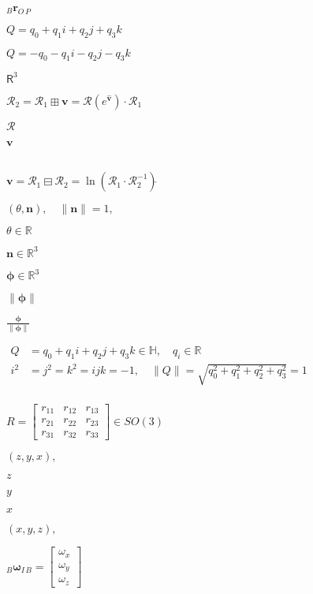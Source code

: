 \documentclass{article}
\begin{document}
${}_B \mathbf{r}_{O\,P}$
\pagebreak

$Q = q_0 + q_1 i + q_2 j + q_3 k$
\pagebreak

$Q = -q_0 - q_1 i - q_2 j - q_3 k$
\pagebreak

$\mathsf{R}^3$
\pagebreak

$\mathcal{R}_2 = \mathcal{R}_1\boxplus\mathbf{v} = \mathcal{R}(e^{\hat{\mathbf{v}}}) \cdot \mathcal{R}_1 $
\pagebreak

$\mathcal{R}$
\pagebreak

$\mathbf{v}$
\pagebreak

$\hat{}$
\pagebreak

$\mathbf{v} = \mathcal{R}_1\boxminus\mathcal{R}_2 = \ln{(\mathcal{R}_1\cdot\mathcal{R}_2^{-1})}\check{}$
\pagebreak

$\boxed{(\theta, \mathbf{n}), \quad \lVert \mathbf{n} \rVert = 1,}$
\pagebreak

$\theta \in \mathbb{R}$
\pagebreak

$\mathbf{n} \in \mathbb{R}^3$
\pagebreak

$\boxed{\mathbf{\phi}\in\mathbb{R}^3}$
\pagebreak

$\lVert \mathbf{\phi} \rVert $
\pagebreak

$\frac{\mathbf{\phi}}{\lVert \mathbf{\phi} \rVert}$
\pagebreak

$\boxed{\begin{aligned}Q &= q_0 + q_1 i + q_2 j + q_3 k \in \mathbb{H}, \quad q_i \in \mathbb{R} \\ i^2 &= j^2=k^2 = ijk = -1, \quad \lVert Q \rVert= \sqrt{q_0^2 + q_1^2 + q_2^2 + q_3^2} = 1 \\ \end{aligned}}$
\pagebreak

$\boxed{R = \begin{bmatrix} r_{11} & r_{12} & r_{13} \\ r_{21} & r_{22} & r_{23} \\ r_{31} & r_{32} & r_{33} \end{bmatrix} \in SO(3)}$
\pagebreak

$\boxed{(z, y, x),}$
\pagebreak

$z$
\pagebreak

$y$
\pagebreak

$x$
\pagebreak

$\boxed{(x, y, z ),}$
\pagebreak

$\boxed{{}_B\mathbf{\omega}_{I\,B} = \begin{bmatrix} \omega_x \\ \omega_y \\ \omega_z \end{bmatrix}}$
\pagebreak
\end{document}

